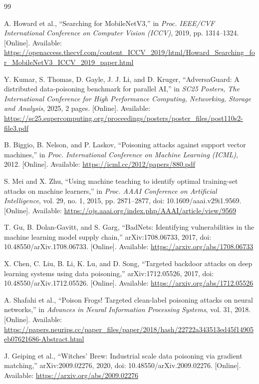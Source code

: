 \documentclass[conference]{IEEEtran}
\begin{document}
\begin{thebibliography}{99}

A. Howard et al., ``Searching for MobileNetV3,'' in \emph{Proc. IEEE/CVF International Conference on Computer Vision (ICCV)}, 2019, pp. 1314--1324. [Online]. Available: \url{https://openaccess.thecvf.com/content_ICCV_2019/html/Howard_Searching_for_MobileNetV3_ICCV_2019_paper.html}

Y. Kumar, S. Thomas, D. Gayle, J. J. Li, and D. Kruger, ``AdversaGuard: A distributed data-poisoning benchmark for parallel AI,'' in \emph{SC25 Posters, The International Conference for High Performance Computing, Networking, Storage and Analysis}, 2025, 2 pages. [Online]. Available: \url{https://sc25.supercomputing.org/proceedings/posters/poster_files/post110s2-file3.pdf}

B. Biggio, B. Nelson, and P. Laskov, ``Poisoning attacks against support vector machines,'' in \emph{Proc. International Conference on Machine Learning (ICML)}, 2012. [Online]. Available: \url{https://icml.cc/2012/papers/880.pdf}

S. Mei and X. Zhu, ``Using machine teaching to identify optimal training-set attacks on machine learners,'' in \emph{Proc. AAAI Conference on Artificial Intelligence}, vol. 29, no. 1, 2015, pp. 2871--2877, doi: 10.1609/aaai.v29i1.9569. [Online]. Available: \url{https://ojs.aaai.org/index.php/AAAI/article/view/9569}

T. Gu, B. Dolan-Gavitt, and S. Garg, ``BadNets: Identifying vulnerabilities in the machine learning model supply chain,'' arXiv:1708.06733, 2017, doi: 10.48550/arXiv.1708.06733. [Online]. Available: \url{https://arxiv.org/abs/1708.06733}

X. Chen, C. Liu, B. Li, K. Lu, and D. Song, ``Targeted backdoor attacks on deep learning systems using data poisoning,'' arXiv:1712.05526, 2017, doi: 10.48550/arXiv.1712.05526. [Online]. Available: \url{https://arxiv.org/abs/1712.05526}

A. Shafahi et al., ``Poison Frogs! Targeted clean-label poisoning attacks on neural networks,'' in \emph{Advances in Neural Information Processing Systems}, vol. 31, 2018. [Online]. Available: \url{https://papers.neurips.cc/paper_files/paper/2018/hash/22722a343513ed45f14905eb07621686-Abstract.html}

J. Geiping et al., ``Witches' Brew: Industrial scale data poisoning via gradient matching,'' arXiv:2009.02276, 2020, doi: 10.48550/arXiv.2009.02276. [Online]. Available: \url{https://arxiv.org/abs/2009.02276}


\end{thebibliography}
\end{document}
